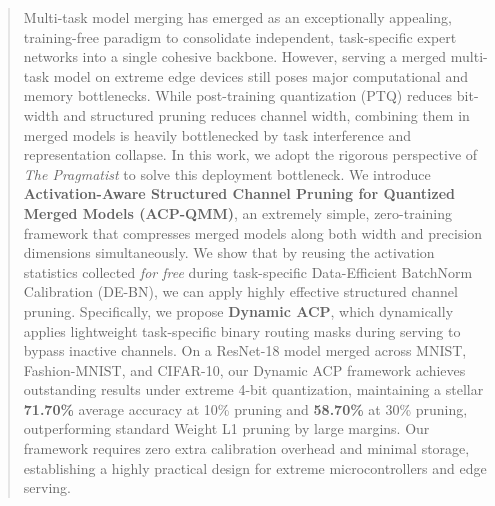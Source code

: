 \documentclass{article}
\theoremstyle{plain}
\theoremstyle{definition}
\theoremstyle{remark}
\begin{document}

\printAffiliationsAndNotice{}

\begin{abstract}
Multi-task model merging has emerged as an exceptionally appealing, training-free paradigm to consolidate independent, task-specific expert networks into a single cohesive backbone. However, serving a merged multi-task model on extreme edge devices still poses major computational and memory bottlenecks. While post-training quantization (PTQ) reduces bit-width and structured pruning reduces channel width, combining them in merged models is heavily bottlenecked by task interference and representation collapse. In this work, we adopt the rigorous perspective of \textit{The Pragmatist} to solve this deployment bottleneck. We introduce \textbf{Activation-Aware Structured Channel Pruning for Quantized Merged Models (ACP-QMM)}, an extremely simple, zero-training framework that compresses merged models along both width and precision dimensions simultaneously. We show that by reusing the activation statistics collected \textit{for free} during task-specific Data-Efficient BatchNorm Calibration (DE-BN), we can apply highly effective structured channel pruning. Specifically, we propose \textbf{Dynamic ACP}, which dynamically applies lightweight task-specific binary routing masks during serving to bypass inactive channels. On a ResNet-18 model merged across MNIST, Fashion-MNIST, and CIFAR-10, our Dynamic ACP framework achieves outstanding results under extreme 4-bit quantization, maintaining a stellar \textbf{71.70\%} average accuracy at 10\% pruning and \textbf{58.70\%} at 30\% pruning, outperforming standard Weight L1 pruning by large margins. Our framework requires zero extra calibration overhead and minimal storage, establishing a highly practical design for extreme microcontrollers and edge serving.
\end{abstract}
\end{document}
